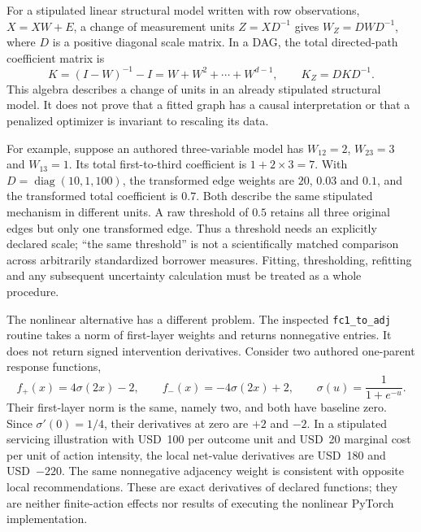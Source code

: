 For a stipulated linear structural model written with row observations,
$X=XW+E$, a change of measurement units $Z=XD^{-1}$ gives
$W_Z=DW D^{-1}$, where $D$ is a positive diagonal scale matrix. In a DAG,
the total directed-path coefficient matrix is
\begin{equation}
 K=(I-W)^{-1}-I=W+W^2+\cdots+W^{d-1},\qquad
 K_Z=DKD^{-1}.
\end{equation}
This algebra describes a change of units in an already stipulated structural
model. It does not prove that a fitted graph has a causal interpretation or
that a penalized optimizer is invariant to rescaling its data.
\citep{exec16_dagma_exact}

For example, suppose an authored three-variable model has
$W_{12}=2$, $W_{23}=3$ and $W_{13}=1$. Its total first-to-third coefficient
is $1+2\times3=7$. With $D=\operatorname{diag}(10,1,100)$, the transformed
edge weights are $20$, $0.03$ and $0.1$, and the transformed total coefficient
is $0.7$. Both describe the same stipulated mechanism in different units.
A raw threshold of $0.5$ retains all three original edges but only one
transformed edge. Thus a threshold needs an explicitly declared scale;
``the same threshold'' is not a scientifically matched comparison across
arbitrarily standardized borrower measures. Fitting, thresholding, refitting
and any subsequent uncertainty calculation must be treated as a whole
procedure.
\citep{exec16_dagma_exact}

The nonlinear alternative has a different problem. The inspected
\texttt{fc1\_to\_adj} routine takes a norm of first-layer weights and returns
nonnegative entries. It does not return signed intervention derivatives.
Consider two authored one-parent response functions,
\begin{equation}
 f_+(x)=4\sigma(2x)-2,\qquad
 f_-(x)=-4\sigma(2x)+2,\qquad
 \sigma(u)=\frac{1}{1+e^{-u}}.
\end{equation}
Their first-layer norm is the same, namely two, and both have baseline zero.
Since $\sigma'(0)=1/4$, their derivatives at zero are $+2$ and $-2$.
In a stipulated servicing illustration with USD~100 per outcome unit and
USD~20 marginal cost per unit of action intensity, the local net-value
derivatives are USD~180 and USD~$-220$. The same nonnegative adjacency
weight is consistent with opposite local recommendations. These are exact
derivatives of declared functions; they are neither finite-action effects
nor results of executing the nonlinear PyTorch implementation.
\citep{exec16_dagma_primary,exec16_dagma_exact}

